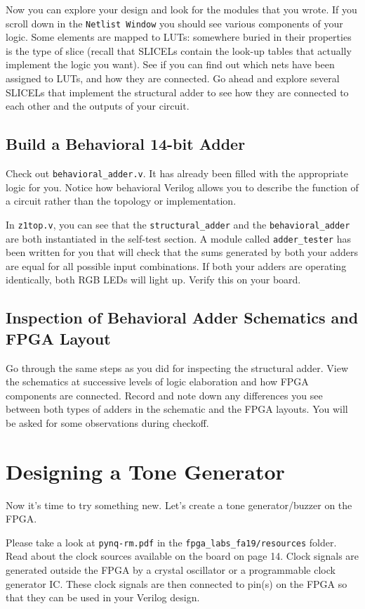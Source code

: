 \documentclass[11pt]{article}
\newcommand{\repo}{fpga\_labs\_fa19}
\begin{document}
Now you can explore your design and look for the modules that you wrote. If you scroll down in the \verb|Netlist Window| you should see various components of your logic. Some elements are mapped to LUTs: somewhere buried in their properties is the type of slice (recall that SLICELs contain the look-up tables that actually implement the logic you want). See if you can find out which nets have been assigned to LUTs, and how they are connected. Go ahead and explore several SLICELs that implement the structural adder to see how they are connected to each other and the outputs of your circuit.

\subsection{Build a Behavioral 14-bit Adder}

Check out \verb|behavioral_adder.v|. It has already been filled with the appropriate logic for you. Notice how behavioral Verilog allows you to describe the function of a circuit rather than the topology or implementation.

In \verb|z1top.v|, you can see that the \verb|structural_adder| and the \verb|behavioral_adder| are both instantiated in the self-test section. A module called \verb|adder_tester| has been written for you that will check that the sums generated by both your adders are equal for all possible input combinations. If both your adders are operating identically, both RGB LEDs will light up. Verify this on your board.

\subsection{Inspection of Behavioral Adder Schematics and FPGA Layout}

Go through the same steps as you did for inspecting the structural adder. View the schematics at successive levels of logic elaboration and how FPGA components are connected. Record and note down any differences you see between both types of adders in the schematic and the FPGA layouts. You will be asked for some observations during checkoff.

\section{Designing a Tone Generator}
Now it's time to try something new. Let's create a tone generator/buzzer on the FPGA.

Please take a look at \verb|pynq-rm.pdf| in the \texttt{\repo/resources} folder.
Read about the clock sources available on the board on page 14.
Clock signals are generated outside the FPGA by a crystal oscillator or a programmable clock generator IC.
These clock signals are then connected to pin(s) on the FPGA so that they can be used in your Verilog design.
\end{document}
